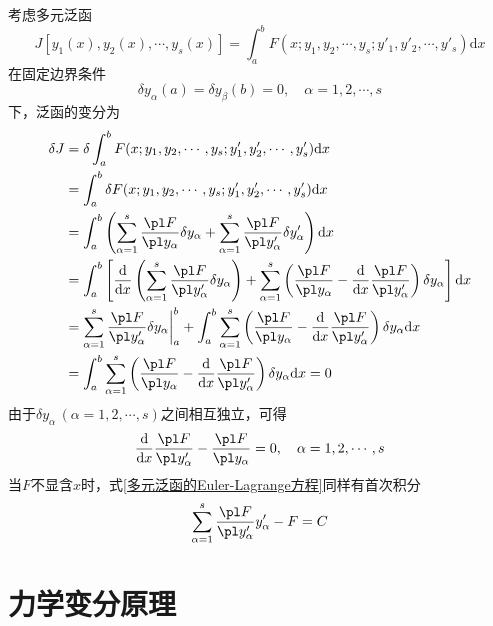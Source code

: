 考虑多元泛函
\begin{equation*}
	J[y_1(x),y_2(x),\cdots,y_s(x)] = \int_a^b F(x;y_1,y_2,\cdots,y_s;y'_1,y'_2,\cdots,y'_s) \mathrm{d} x
\end{equation*}
在固定边界条件
\begin{equation*}
	\delta y_\alpha(a) = \delta y_\beta(b) = 0,\quad \alpha = 1,2,\cdots,s
\end{equation*}
下，泛函的变分为
\begin{align*}
	\delta J & = \delta \int_a^b F(x;y_1,y_2,\cdots,y_s;y'_1,y'_2,\cdots,y'_s) \mathrm{d} x \\
	& = \int_a^b \delta F(x;y_1,y_2,\cdots,y_s;y'_1,y'_2,\cdots,y'_s) \mathrm{d} x \\
	& = \int_a^b \left(\sum_{\alpha=1}^s \frac{\pl F}{\pl y_\alpha} \delta y_\alpha + \sum_{\alpha=1}^s \frac{\pl F}{\pl y'_\alpha} \delta y'_\alpha\right) \mathrm{d} x \\
	& = \int_a^b \left[\frac{\mathrm{d}}{\mathrm{d} x} \left(\sum_{\alpha=1}^s \frac{\pl F}{\pl y'_\alpha} \delta y_\alpha\right) + \sum_{\alpha=1}^s \left(\frac{\pl F}{\pl y_\alpha} - \frac{\mathrm{d}}{\mathrm{d} x} \frac{\pl F}{\pl y'_\alpha} \right) \delta y_\alpha\right] \mathrm{d} x \\
	& = \sum_{\alpha=1}^s \frac{\pl F}{\pl y'_\alpha} \delta y_\alpha \bigg|_a^b + \int_a^b \sum_{\alpha=1}^s \left(\frac{\pl F}{\pl y_\alpha} - \frac{\mathrm{d}}{\mathrm{d} x} \frac{\pl F}{\pl y'_\alpha} \right) \delta y_\alpha \mathrm{d} x \\
	& = \int_a^b \sum_{\alpha=1}^s \left(\frac{\pl F}{\pl y_\alpha} - \frac{\mathrm{d}}{\mathrm{d} x} \frac{\pl F}{\pl y'_\alpha} \right) \delta y_\alpha \mathrm{d} x = 0
\end{align*}
由于$\delta y_\alpha\,(\alpha=1,2,\cdots,s)$之间相互独立，可得
\begin{equation}
	\frac{\mathrm{d}}{\mathrm{d} x} \frac{\pl F}{\pl y'_\alpha} - \frac{\pl F}{\pl y_\alpha} = 0,\quad \alpha = 1,2,\cdots,s
	\label{多元泛函的Euler-Lagrange方程}
\end{equation}
当$F$不显含$x$时，式\eqref{多元泛函的Euler-Lagrange方程}同样有首次积分
\begin{equation*}
	\sum_{\alpha=1}^s \frac{\pl F}{\pl y'_\alpha} y'_\alpha - F = C
\end{equation*}

\section{力学变分原理}

